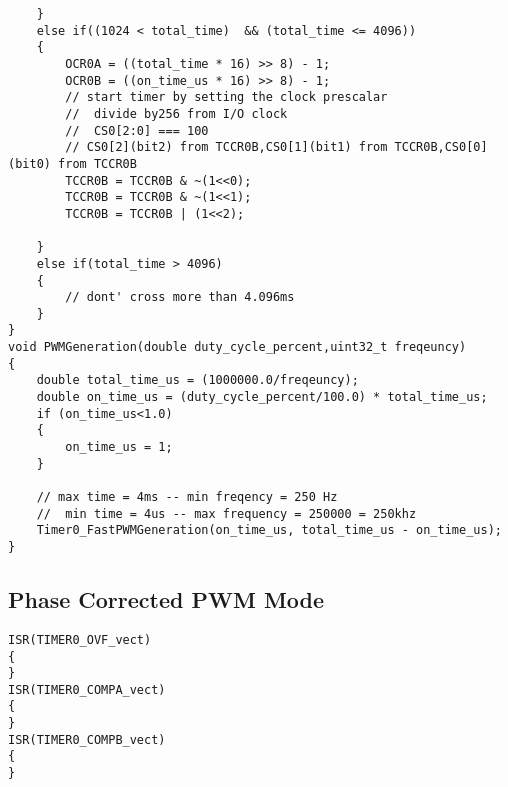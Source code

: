 \begin{verbatim}
	}
	else if((1024 < total_time)  && (total_time <= 4096))
	{
		OCR0A = ((total_time * 16) >> 8) - 1;
		OCR0B = ((on_time_us * 16) >> 8) - 1;
		// start timer by setting the clock prescalar
		//  divide by256 from I/O clock
		//  CS0[2:0] === 100
		// CS0[2](bit2) from TCCR0B,CS0[1](bit1) from TCCR0B,CS0[0](bit0) from TCCR0B
		TCCR0B = TCCR0B & ~(1<<0);
		TCCR0B = TCCR0B & ~(1<<1);
		TCCR0B = TCCR0B | (1<<2);
		
	}
	else if(total_time > 4096)
	{
		// dont' cross more than 4.096ms
	}
}
void PWMGeneration(double duty_cycle_percent,uint32_t freqeuncy)
{
	double total_time_us = (1000000.0/freqeuncy);	
	double on_time_us = (duty_cycle_percent/100.0) * total_time_us;
	if (on_time_us<1.0)
	{
		on_time_us = 1;
	}
	
	// max time = 4ms -- min freqency = 250 Hz
	//  min time = 4us -- max frequency = 250000 = 250khz
	Timer0_FastPWMGeneration(on_time_us, total_time_us - on_time_us);
}
\end{verbatim}


\subsection{Phase Corrected PWM Mode}
\begin{verbatim}
ISR(TIMER0_OVF_vect)
{
} 
ISR(TIMER0_COMPA_vect)
{
}
ISR(TIMER0_COMPB_vect)
{
}
\end{verbatim}
